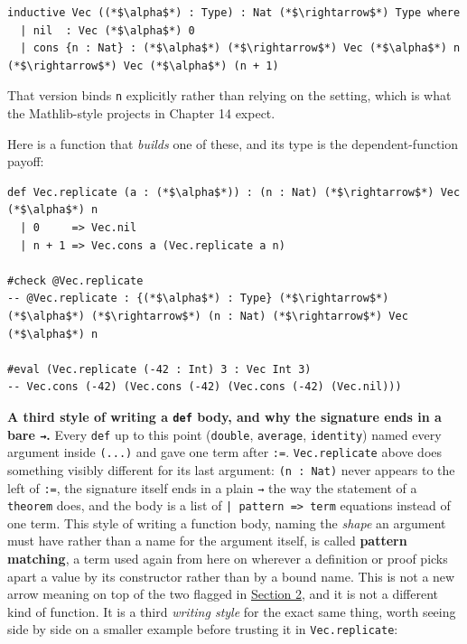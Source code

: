 \begin{lstlisting}
inductive Vec ((*$\alpha$*) : Type) : Nat (*$\rightarrow$*) Type where
  | nil  : Vec (*$\alpha$*) 0
  | cons {n : Nat} : (*$\alpha$*) (*$\rightarrow$*) Vec (*$\alpha$*) n (*$\rightarrow$*) Vec (*$\alpha$*) (n + 1)
\end{lstlisting}

That version binds \texttt{n} explicitly rather than relying on the setting, which is what the Mathlib-style projects in Chapter 14 expect.

Here is a function that \emph{builds} one of these, and its type is the dependent-function payoff:

\begin{lstlisting}
def Vec.replicate (a : (*$\alpha$*)) : (n : Nat) (*$\rightarrow$*) Vec (*$\alpha$*) n
  | 0     => Vec.nil
  | n + 1 => Vec.cons a (Vec.replicate a n)

#check @Vec.replicate
-- @Vec.replicate : {(*$\alpha$*) : Type} (*$\rightarrow$*) (*$\alpha$*) (*$\rightarrow$*) (n : Nat) (*$\rightarrow$*) Vec (*$\alpha$*) n

#eval (Vec.replicate (-42 : Int) 3 : Vec Int 3)
-- Vec.cons (-42) (Vec.cons (-42) (Vec.cons (-42) (Vec.nil)))
\end{lstlisting}

\textbf{A third style of writing a \texttt{def} body, and why the signature ends in a bare \texttt{→}.} Every \texttt{def} up to this point (\texttt{double}, \texttt{average}, \texttt{identity}) named every argument inside \texttt{(...)} and gave one term after \texttt{:=}. \texttt{Vec.replicate} above does something visibly different for its last argument: \texttt{(n : Nat)} never appears to the left of \texttt{:=}, the signature itself ends in a plain \texttt{→} the way the statement of a \texttt{theorem} does, and the body is a list of \texttt{| pattern => term} equations instead of one term. This style of writing a function body, naming the \emph{shape} an argument must have rather than a name for the argument itself, is called \textbf{pattern matching}, a term used again from here on wherever a definition or proof picks apart a value by its constructor rather than by a bound name. This is not a new arrow meaning on top of the two flagged in \hyperref[sec:01-basics:02-def-let-implicit:1]{Section 2}, and it is not a different kind of function. It is a third \emph{writing style} for the exact same thing, worth seeing side by side on a smaller example before trusting it in \texttt{Vec.replicate}:

